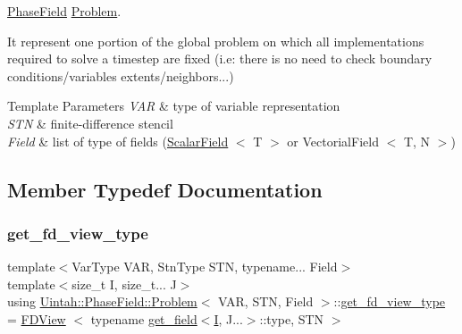 \hyperlink{namespaceUintah_1_1PhaseField}{Phase\+Field} \hyperlink{classUintah_1_1PhaseField_1_1Problem}{Problem}. 

It represent one portion of the global problem on which all implementations required to solve a timestep are fixed (i.\+e\+: there is no need to check boundary conditions/variables extents/neighbors...) 
\begin{DoxyTemplParams}{Template Parameters}
{\em V\+AR} & type of variable representation \\
\hline
{\em S\+TN} & finite-\/difference stencil \\
\hline
{\em Field} & list of type of fields (\hyperlink{structUintah_1_1PhaseField_1_1ScalarField}{Scalar\+Field} $<$ T $>$ or Vectorial\+Field $<$ T, N $>$) \\
\hline
\end{DoxyTemplParams}


\subsection{Member Typedef Documentation}
\mbox{\label{classUintah_1_1PhaseField_1_1Problem_a89c10e32620acbe3cae959667a1cdd3e}} 
\subsubsection{\texorpdfstring{get\+\_\+fd\+\_\+view\+\_\+type}{get\_fd\_view\_type}}
{\footnotesize\ttfamily template$<$Var\+Type V\+AR, Stn\+Type S\+TN, typename... Field$>$ \\
template$<$size\+\_\+t I, size\+\_\+t... J$>$ \\
using \hyperlink{classUintah_1_1PhaseField_1_1Problem}{Uintah\+::\+Phase\+Field\+::\+Problem}$<$ V\+AR, S\+TN, Field $>$\+::\hyperlink{classUintah_1_1PhaseField_1_1Problem_a89c10e32620acbe3cae959667a1cdd3e}{get\+\_\+fd\+\_\+view\+\_\+type} =  \hyperlink{namespaceUintah_1_1PhaseField_a63032464b1cd54eaa53c1c29109746ac}{F\+D\+View} $<$ typename \hyperlink{structUintah_1_1PhaseField_1_1Problem_1_1get__field}{get\+\_\+field}$<$\hyperlink{structUintah_1_1PhaseField_1_1I}{I}, J...$>$\+::type, S\+TN $>$}



